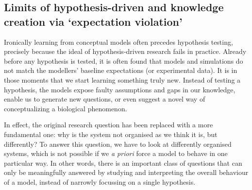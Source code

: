 \subsection{Limits of hypothesis-driven and knowledge creation via `expectation violation'}

Ironically learning from conceptual models often precedes hypothesis testing, precisely because the ideal of hypothesis-driven research fails in practice. Already before any hypothesis is tested, it is often found that models and simulations do not match the modellers’ baseline expectations (or experimental data). It is in those moments that we start learning something truly new. Instead of testing a hypothesis, the models expose faulty assumptions and gaps in our knowledge, enable us to generate new questions, or even suggest a novel way of conceptualizing a biological phenomenon. 

In effect, the original research question has been replaced with a more fundamental one: why is the system not organised as we think it is, but differently? To answer this question, we have to look at differently organised systems, which is not possible if we \emph{a priori} force a model to behave in one particular way. In other words, there is an important class of questions that can only be meaningfully answered by studying and interpreting the overall behaviour of a model, instead of narrowly focussing on a single hypothesis.